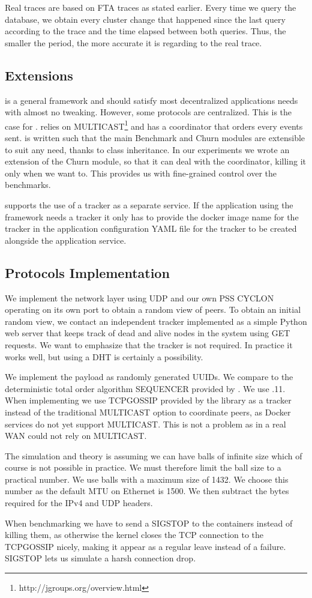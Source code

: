Real traces are based on FTA traces as stated earlier. Every time we query the database, we obtain every cluster change that happened since the last query according to the trace and the time elapsed between both queries. Thus, the smaller the period, the more accurate it is regarding to the real trace.
\subsection{Extensions}
\sys is a general framework and should satisfy most decentralized applications needs with almost no tweaking. However, some protocols are centralized. This is the case for \jgroups. \jgroups relies on MULTICAST\footnote{http://jgroups.org/overview.html} and has a coordinator that orders every events sent. \sys is written such that the main Benchmark and Churn modules are extensible to suit any need, thanks to class inheritance. In our experiments we wrote an extension of the Churn module, so that it can deal with the coordinator, killing it only when we want to. This provides us with fine-grained control over the benchmarks. 

\sys supports the use of a tracker as a separate service. If the application using the framework needs a tracker it only has to provide the docker image name for the tracker in the application configuration YAML file for the tracker to be created alongside the application service.
\subsection{Protocols Implementation}
We implement the network layer using UDP and our own PSS CYCLON operating on its own port to obtain a random view of peers. To obtain an initial random view, we contact an independent tracker implemented as a simple Python web server that keeps track of dead and alive nodes in the system using GET requests. We want to emphasize that the tracker is not required. In practice it works well, but using a DHT is certainly a possibility.

We implement the payload as randomly generated UUIDs. We compare \epto to the deterministic total order algorithm SEQUENCER provided by \jgroups. We use .11. When implementing \jgroups we use TCPGOSSIP \autocite{tcpgossip} provided by the \jgroups library as a tracker instead of the traditional MULTICAST option to coordinate peers, as Docker services do not yet support MULTICAST. This is not a problem as in a real WAN \jgroups could not rely on MULTICAST.

The \epto simulation and theory is assuming we can have balls of infinite size which of course is not possible in practice.
We must therefore limit the ball size to a practical number. We use balls with a maximum size of \SI{1432}{\byte}. We choose this number as the default MTU on Ethernet is \SI{1500}{\byte}. We then subtract the bytes required for the IPv4 and UDP headers.

When benchmarking \jgroups we have to send a SIGSTOP to the containers instead of killing them, as otherwise the kernel closes the TCP connection to the TCPGOSSIP nicely, making it appear as a regular leave instead of a failure. SIGSTOP lets us simulate a harsh connection drop.
